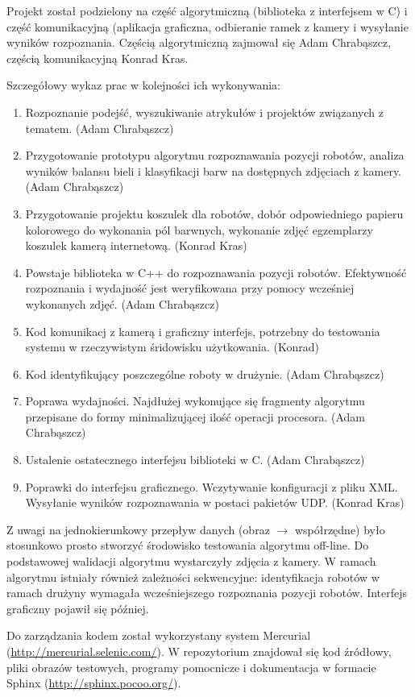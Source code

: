 \documentclass[polish,12pt]{aghthesis}
\begin{document}
Projekt został podzielony na część algorytmiczną (biblioteka z interfejsem w C)
i część komunikacyjną (aplikacja graficzna, odbieranie ramek z kamery i 
wysyłanie wyników rozpoznania. 
Częścią algorytmiczną zajmował się Adam Chrabąszcz, częścią komunikacyjną 
Konrad Kras.

Szczegółowy wykaz prac w kolejności ich wykonywania:
\begin{enumerate}
\item Rozpoznanie podejść, wyszukiwanie atrykułów i projektów związanych z
tematem. (Adam Chrabąszcz)
\item Przygotowanie prototypu algorytmu rozpoznawania pozycji robotów,
analiza wyników balansu bieli i klasyfikacji barw na dostępnych zdjęciach z
kamery. (Adam Chrabąszcz)
\item Przygotowanie projektu koszulek dla robotów, dobór odpowiedniego papieru
kolorowego do wykonania pól barwnych, wykonanie zdjęć egzemplarzy koszulek
kamerą internetową. (Konrad Kras)
\item Powstaje biblioteka w C++ do rozpoznawania pozycji robotów. Efektywność
rozpoznania i wydajność jest weryfikowana przy pomocy wcześniej wykonanych 
zdjęć. (Adam Chrabąszcz)
\item Kod komunikacj z kamerą i graficzny interfejs, potrzebny do testowania
systemu w rzeczywistym śridowisku użytkowania. (Konrad)
\item Kod identyfikujący poszczególne roboty w drużynie. (Adam Chrabąszcz)
\item Poprawa wydajności. Najdłużej wykonujące się fragmenty algorytmu 
przepisane do formy minimalizującej ilość operacji procesora. (Adam Chrabąszcz)
\item Ustalenie ostatecznego interfejsu biblioteki w C. (Adam Chrabąszcz)
\item Poprawki do interfejsu graficznego. Wczytywanie konfiguracji z pliku XML.
Wysyłanie wyników rozpoznawania w postaci pakietów UDP. (Konrad Kras)
\end{enumerate}
Z uwagi na jednokierunkowy przepływ danych (obraz $\to$ współrzędne) było 
stosunkowo prosto stworzyć środowisko testowania algorytmu off-line. Do 
podstawowej walidacji algorytmu wystarczyły zdjęcia z kamery. W ramach 
algorytmu istniały również zależności 
sekwencyjne: identyfikacja robotów w ramach drużyny wymagała wcześniejszego 
rozpoznania pozycji robotów. Interfejs 
graficzny pojawił się później. 

Do zarządzania kodem został wykorzystany system Mercurial
(\url{http://mercurial.selenic.com/}). 
W repozytorium znajdował się kod źródłowy, pliki obrazów testowych, programy
pomocnicze i dokumentacja w formacie Sphinx (\url{http://sphinx.pocoo.org/}).
\end{document}
